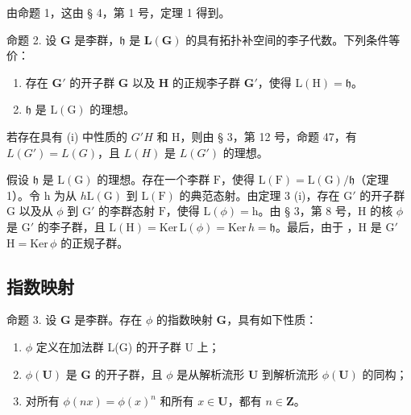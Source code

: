由命题 1，这由 § 4，第 1 号，定理 1 得到。

命题 2. 设 \(\mathbf{G}\) 是李群，\(\mathfrak{h}\) 是 \(\mathbf{L}(\mathbf{G})\) 的具有拓扑补空间的李子代数。下列条件等价：

\begin{enumerate}
\def\labelenumi{(\roman{enumi})}
\item
  存在 \(\mathbf{G}'\) 的开子群 \(\mathbf{G}\) 以及 \(\mathbf{H}\) 的正规李子群 \(\mathbf{G}'\)，使得 \(\mathrm{L(H)} = \mathfrak{h}\)。
\item
  \(\mathfrak{h}\) 是 \(\mathrm{L}(\mathrm{G})\) 的理想。
\end{enumerate}

若存在具有 (i) 中性质的 \(G'\)\(H\) 和 H，则由 § 3，第 12 号，命题 47，有 \(L(G') = L(G)\)，且 \(L(H)\) 是 \(L(G')\) 的理想。

假设 \(\mathfrak{h}\) 是 \(\mathrm{L}(\mathrm{G})\) 的理想。存在一个李群 \(\mathrm{F}\)，使得 \(\mathrm{L}(\mathrm{F}) = \mathrm{L}(\mathrm{G}) / \mathfrak{h}\)（定理 1）。令 h 为从 \(h\)\(\mathrm{L}(\mathrm{G})\) 到 \(\mathrm{L}(\mathrm{F})\) 的典范态射。由定理 3 (i)，存在 \(\mathrm{G}'\) 的开子群 \(\mathrm{G}\) 以及从 \(\phi\) 到 \(\mathrm{G}'\) 的李群态射 \(\mathrm{F}\)，使得 \(\mathrm{L}(\phi) = \mathrm{h}\)。由 § 3，第 8 号，\(\mathrm{H}\) 的核 \(\phi\) 是 \(\mathrm{G}'\) 的李子群，且 \(\mathrm{L}(\mathrm{H}) = \mathrm{Ker} \, \mathrm{L}(\phi) = \mathrm{Ker} \, h = \mathfrak{h}\)。最后，由于 ，\(\mathrm{H}\) 是 \(\mathrm{G}'\)\(\mathrm{H} = \mathrm{Ker} \, \phi\) 的正规子群。

\subsection{指数映射}

命题 3. 设 \(\mathbf{G}\) 是李群。存在 \(\phi\) 的指数映射 \(\mathbf{G}\)，具有如下性质：

\begin{enumerate}
\def\labelenumi{(\roman{enumi})}
\item
  \(\phi\) 定义在加法群 L(G) 的开子群 U 上；
\item
  \(\phi (\mathbf{U})\) 是 \(\mathbf{G}\) 的开子群，且 \(\phi\) 是从解析流形 \(\mathbf{U}\) 到解析流形 \(\phi (\mathbf{U})\) 的同构；
\item
  对所有 \(\phi(nx) = \phi(x)^n\) 和所有 \(x \in \mathbf{U}\)，都有 \(n \in \mathbf{Z}\)。
\end{enumerate}

